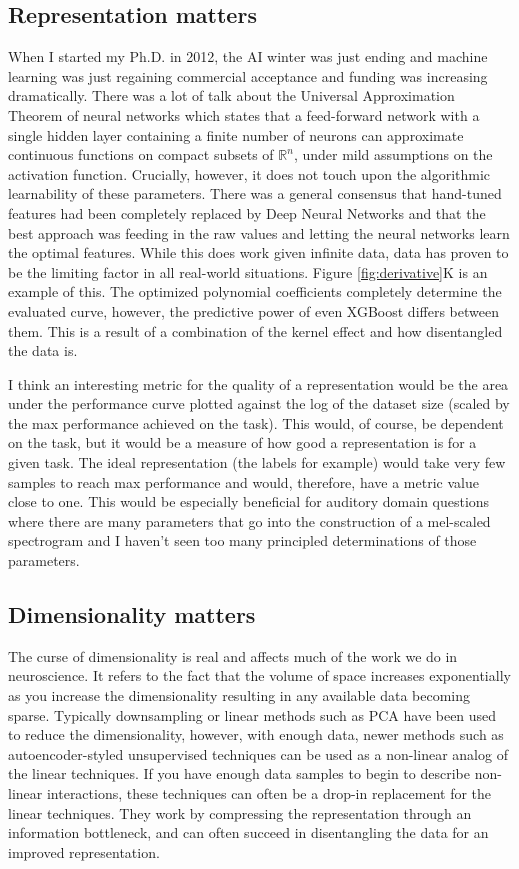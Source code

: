 \subsection{Representation matters}
When I started my Ph.D. in 2012, the AI winter was just ending and machine learning was just regaining commercial acceptance and funding was increasing dramatically. There was a lot of talk about the Universal Approximation Theorem of neural networks \cite{csaji2001approximation} which states that a feed-forward network with a single hidden layer containing a finite number of neurons can approximate continuous functions on compact subsets of $\mathbb{R}^n$, under mild assumptions on the activation function. Crucially, however, it does not touch upon the algorithmic learnability of these parameters. There was a general consensus that hand-tuned features had been completely replaced by Deep Neural Networks and that the best approach was feeding in the raw values and letting the neural networks learn the optimal features. While this does work given infinite data, data has proven to be the limiting factor in all real-world situations\cite{halevy2009unreasonable, sun2017revisiting}. Figure \ref{fig:derivative}K is an example of this. The optimized polynomial coefficients completely determine the evaluated \Thielk curve, however, the predictive power of even XGBoost differs between them. This is a result of a combination of the kernel effect and how disentangled the data is. 

I think an interesting metric for the quality of a representation would be the area under the performance curve plotted against the log of the dataset size (scaled by the max performance achieved on the task). This would, of course, be dependent on the task, but it would be a measure of how good a representation is for a given task. The ideal representation (the labels for example) would take very few samples to reach max performance and would, therefore, have a metric value close to one. This would be especially beneficial for auditory domain questions where there are many parameters that go into the construction of a mel-scaled spectrogram and I haven't seen too many principled determinations of those parameters.

\subsection{Dimensionality matters}
The curse of dimensionality is real and affects much of the work we do in neuroscience. It refers to the fact that the volume of space increases exponentially as you increase the dimensionality resulting in any available data becoming sparse. Typically downsampling or linear methods such as PCA have been used to reduce the dimensionality, however, with enough data, newer methods such as autoencoder-styled unsupervised techniques can be used as a non-linear analog of the linear techniques. If you have enough data samples to begin to describe non-linear interactions, these techniques can often be a drop-in replacement for the linear techniques. They work by compressing the representation through an information bottleneck, and can often succeed in disentangling the data for an improved representation.

